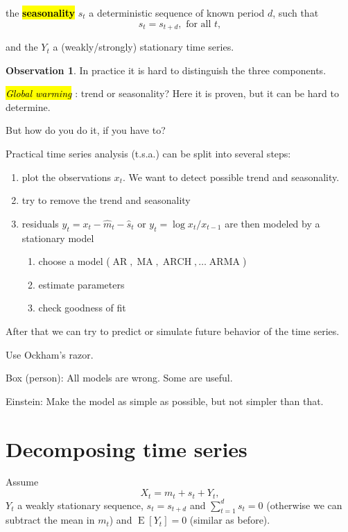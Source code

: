\documentclass[12pt,a4paper, notitlepage]{book}
\newcommand{\hlc}[2][yellow]{ {\sethlcolor{#1} \hl{#2}} }
\newcommand{\hlcr}[1]{\hlc[lightred]{#1}}
\theoremstyle{definition} %
\newtheorem*{observation}{Observation}
\theoremstyle{plain} %
\DeclareMathOperator{\E}{E}
\DeclareMathOperator{\Arma}{ARMA}
\DeclareMathOperator{\Ar}{AR}
\DeclareMathOperator{\Ma}{MA}
\DeclareMathOperator{\Arch}{ARCH}
\newcommand{\New}[1]{ {\bf \hlcr{#1} } }
\newcommand{\Important}[1]{ {\it \hlc{#1} } }
\begin{document}
the \New{ seasonality} $s_t$ a deterministic sequence of known period $d$, such that 
\[ s_t = s_{t+d} ,  \text{ for all } t , \]

and the $Y_t$ a (weakly/strongly) stationary time series.


\begin{observation}
In practice it is hard to distinguish the three components. 

\Important{Global warming} : trend or seasonality? Here it is proven, but it can be hard to determine.
\end{observation}

But how do you do it, if you have to?

Practical time series analysis (t.s.a.) can be split into several steps:
\begin{enumerate}
\item plot the observations $x_t$. We want to detect possible trend and seasonality. 
\item try to remove the trend and seasonality
\item residuals $y_t = x_t - \hat{m}_t - \hat{s}_t$ or $y_t = \log{x_t / x_{t-1}}$ are then modeled  by a stationary model
\begin{enumerate}
\item choose a model ($\Ar, \Ma, \Arch , \dots \Arma$)
\item estimate parameters
\item check goodness of fit
\end{enumerate}
\end{enumerate}
After that we can try to predict or simulate future behavior of the time series.

Use Ockham's razor.

Box (person): All models are wrong. Some are useful.

Einstein: Make the model as simple as possible, but not simpler than that.

\section{ Decomposing time series}

\vskip1cm


Assume 
\[ X_t = m_t + s_t + Y_t, \]
 $Y_t$ a weakly stationary sequence, $s_t = s_{t+d}$ and $\sum_{t=1}^d s_t = 0$ (otherwise we can subtract the mean in $m_t$) and $ \E [Y_t] = 0$ (similar as before). 
\end{document}
